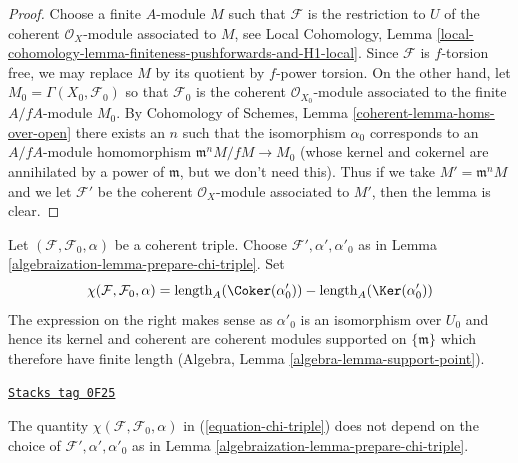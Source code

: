\begin{proof}
Choose a finite $A$-module $M$ such that $\mathcal{F}$ is the restriction
to $U$ of the coherent $\mathcal{O}_X$-module associated to $M$, see
Local Cohomology, Lemma
\ref{local-cohomology-lemma-finiteness-pushforwards-and-H1-local}.
Since $\mathcal{F}$ is $f$-torsion free, we may replace $M$ by
its quotient by $f$-power torsion.
On the other hand, let $M_0 = \Gamma(X_0, \mathcal{F}_0)$
so that $\mathcal{F}_0$ is the coherent $\mathcal{O}_{X_0}$-module
associated to the finite $A/fA$-module $M_0$.
By Cohomology of Schemes, Lemma \ref{coherent-lemma-homs-over-open}
there exists an $n$ such that the
isomorphism $\alpha_0$ corresponds to an $A/fA$-module homomorphism
$\mathfrak m^n M/fM \to M_0$ (whose kernel and cokernel
are annihilated by a power of $\mathfrak m$, but we don't need this).
Thus if we take $M' = \mathfrak m^n M$ and we let
$\mathcal{F}'$ be the coherent $\mathcal{O}_X$-module
associated to $M'$, then the lemma is clear.
\end{proof}

Let $(\mathcal{F}, \mathcal{F}_0, \alpha)$ be a coherent triple.
Choose $\mathcal{F}', \alpha', \alpha'_0$ as in
Lemma \ref{algebraization-lemma-prepare-chi-triple}. Set
\begin{equation}
\label{equation-chi-triple}
\chi(\mathcal{F}, \mathcal{F}_0, \alpha) =
\text{length}_A(\Coker(\alpha'_0)) -
\text{length}_A(\Ker(\alpha'_0))
\end{equation}
The expression on the right makes sense as $\alpha'_0$ is an isomorphism
over $U_0$ and hence its kernel and coherent are coherent modules supported
on $\{\mathfrak m\}$ which therefore have finite length
(Algebra, Lemma \ref{algebra-lemma-support-point}).

\begin{lemma}
\label{algebraization-lemma-well-defined-chi-triple}
\href{https://stacks.math.columbia.edu/tag/0F25}{\texttt{Stacks tag 0F25}}

The quantity $\chi(\mathcal{F}, \mathcal{F}_0, \alpha)$ in
(\ref{equation-chi-triple}) does not depend on the choice of
$\mathcal{F}', \alpha', \alpha'_0$ as in Lemma \ref{algebraization-lemma-prepare-chi-triple}.
\end{lemma}

